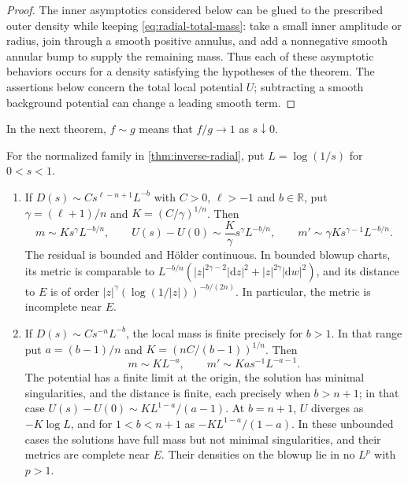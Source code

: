 \begin{proof}
The inner asymptotics considered below can be glued to the prescribed outer density while keeping \eqref{eq:radial-total-mass}: take a small inner amplitude or radius, join through a smooth positive annulus, and add a nonnegative smooth annular bump to supply the remaining mass. Thus each of these asymptotic behaviors occurs for a density satisfying the hypotheses of the theorem. The assertions below concern the total local potential $U$; subtracting a smooth background potential can change a leading smooth term.
\end{proof}

In the next theorem, $f\sim g$ means that $f/g\to1$ as $s\downarrow0$.

\begin{theorem}\label{thm:radial-endpoints}
For the normalized family in \cref{thm:inverse-radial}, put $L=\log(1/s)$ for $0<s<1$.
\begin{enumerate}
\item If $D(s)\sim Cs^{\ell-n+1}L^{-b}$ with $C>0$, $\ell>-1$ and $b\in\mathbb R$, put $\gamma=(\ell+1)/n$ and $K=(C/\gamma)^{1/n}$. Then
\begin{equation}\label{eq:power-log-asymptotics}
 m\sim Ks^\gamma L^{-b/n},\qquad
 U(s)-U(0)\sim\frac K\gamma s^\gamma L^{-b/n},\qquad
 m'\sim\gamma K s^{\gamma-1}L^{-b/n}.
\end{equation}
The residual is bounded and H\"older continuous. In bounded blowup charts, its metric is comparable to
$L^{-b/n}(|z|^{2\gamma-2}|\mathrm{d} z|^2+|z|^{2\gamma}|\mathrm{d} w|^2)$, and its distance to $E$ is of order $|z|^\gamma(\log(1/|z|))^{-b/(2n)}$. In particular, the metric is incomplete near $E$.
\item If $D(s)\sim Cs^{-n}L^{-b}$, the local mass is finite precisely for $b>1$. In that range put $a=(b-1)/n$ and $K=(nC/(b-1))^{1/n}$. Then
\begin{equation}\label{eq:single-log-asymptotics}
 m\sim KL^{-a},\qquad m'\sim Ka s^{-1}L^{-a-1}.
\end{equation}
The potential has a finite limit at the origin, the solution has minimal singularities, and the distance is finite, each precisely when $b>n+1$; in that case $U(s)-U(0)\sim K L^{1-a}/(a-1)$. At $b=n+1$, $U$ diverges as $-K\log L$, and for $1<b<n+1$ as $-K L^{1-a}/(1-a)$. In these unbounded cases the solutions have full mass but not minimal singularities, and their metrics are complete near $E$. Their densities on the blowup lie in no $L^p$ with $p>1$.

\end{enumerate}
\end{theorem}
